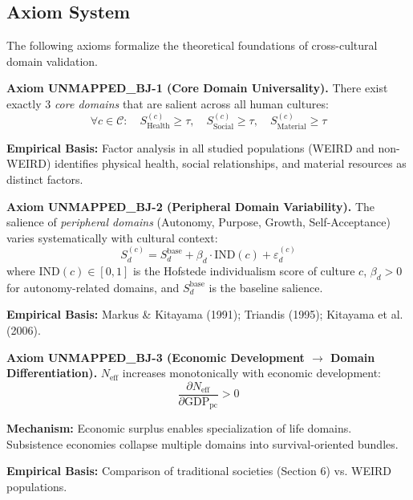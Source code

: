 \subsection{Axiom System}

The following axioms formalize the theoretical foundations of cross-cultural domain validation.

\begin{tcolorbox}[colback=red!5!white, colframe=red!75!black, title=Axiom UNMAPPED_BJ-1: Core Domain Universality]
\textbf{Axiom UNMAPPED_BJ-1 (Core Domain Universality).}
There exist exactly 3 \textit{core domains} that are salient across all human cultures:
\begin{equation}
\forall c \in \mathcal{C}: \quad S_{\text{Health}}^{(c)} \geq \tau, \quad S_{\text{Social}}^{(c)} \geq \tau, \quad S_{\text{Material}}^{(c)} \geq \tau
\end{equation}

\textbf{Empirical Basis:} Factor analysis in all studied populations (WEIRD and non-WEIRD) identifies
physical health, social relationships, and material resources as distinct factors.
\end{tcolorbox}

\begin{tcolorbox}[colback=red!5!white, colframe=red!75!black, title=Axiom UNMAPPED_BJ-2: Peripheral Domain Variability]
\textbf{Axiom UNMAPPED_BJ-2 (Peripheral Domain Variability).}
The salience of \textit{peripheral domains} (Autonomy, Purpose, Growth, Self-Acceptance)
varies systematically with cultural context:
\begin{equation}
S_d^{(c)} = S_d^{\text{base}} + \beta_d \cdot \text{IND}(c) + \varepsilon_d^{(c)}
\end{equation}
where $\text{IND}(c) \in [0,1]$ is the Hofstede individualism score of culture $c$,
$\beta_d > 0$ for autonomy-related domains, and $S_d^{\text{base}}$ is the baseline salience.

\textbf{Empirical Basis:} Markus \& Kitayama (1991); Triandis (1995); Kitayama et al. (2006).
\end{tcolorbox}

\begin{tcolorbox}[colback=red!5!white, colframe=red!75!black, title=Axiom UNMAPPED_BJ-3: Domain Differentiation Gradient]
\textbf{Axiom UNMAPPED_BJ-3 (Economic Development $\rightarrow$ Domain Differentiation).}
$N_{\text{eff}}$ increases monotonically with economic development:
\begin{equation}
\frac{\partial N_{\text{eff}}}{\partial \text{GDP}_{\text{pc}}} > 0
\end{equation}

\textbf{Mechanism:} Economic surplus enables specialization of life domains. Subsistence economies
collapse multiple domains into survival-oriented bundles.

\textbf{Empirical Basis:} Comparison of traditional societies (Section 6) vs. WEIRD populations.
\end{tcolorbox}

